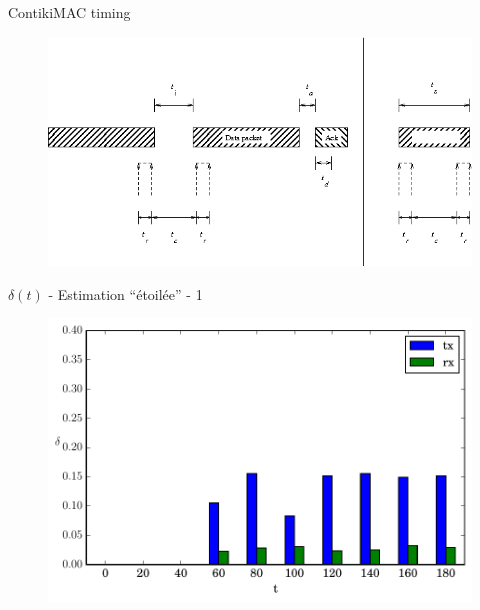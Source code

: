\begin{frame}{ContikiMAC timing}
  \begin{figure}
    \centering
    \includegraphics[width=\textwidth]{figures/contikimac_timing.png}
  \end{figure}
\end{frame}

\begin{frame}{$\delta(t)$ - Estimation ``étoilée'' - 1}
  \begin{figure}
    \centering  
    \includegraphics[width=\textwidth]{figures/evolution_noinfo_1.pdf}
  \end{figure}
\end{frame}

